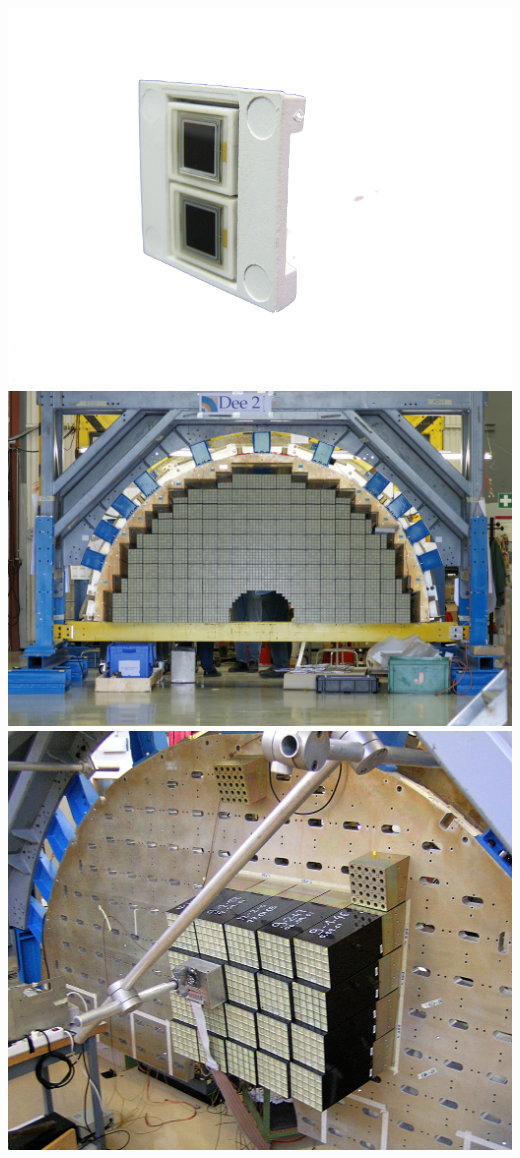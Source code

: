 \begin{itemize}[label=$\bullet$]
	\marginpar
	{
		\centering
		\includegraphics[width=\marginparwidth]{CMS/APD.png}
		\label{APD}
	}
	\marginpar
	{
		\centering
		\includegraphics[width=\marginparwidth]{CMS/dee.jpg}
		\label{DEE}
	}
	\marginpar
	{
		\centering
		\includegraphics[width=\marginparwidth]{CMS/20SCs.jpg}
}
\end{itemize}
